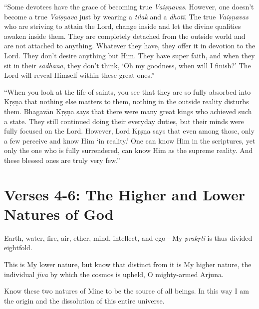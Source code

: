 \enquote{Some devotees have the grace of becoming true \textit{Vaiṣṇavas}. However, one doesn’t become a true \textit{Vaiṣṇava} just by wearing a \textit{tilak} and a \textit{dhotī}. The true \textit{Vaiṣṇavas} who are striving to attain the Lord, change inside and let the divine qualities awaken inside them. They are completely detached from the outside world and are not attached to anything. Whatever they have, they offer it in devotion to the Lord. They don’t desire anything but Him. They have super faith, and when they sit in their \textit{sādhana}, they don’t think, \enquote{Oh my goodness, when will I finish?} The Lord will reveal Himself within these great ones.}

\enquote{When you look at the life of saints, you see that they are so fully absorbed into Kṛṣṇa that nothing else matters to them, nothing in the outside reality disturbs them. Bhagavān Kṛṣṇa says that there were many great kings who achieved such a state. They still continued doing their everyday duties, but their minds were fully focused on the Lord. However, Lord Kṛṣṇa says that even among those, only a few perceive and know Him \enquote{in reality.} One can know Him in the scriptures, yet only the one who is fully surrendered, can know Him as the supreme reality. And these blessed ones are truly very few.}

\section{Verses 4-6: The Higher and Lower Natures of God}\label{sec-verses-4-11-the-higher-and-lower-natures-of-god}
{Earth, water, fire, air, ether, mind, intellect, and ego---My \textit{prakṛti} is thus divided eightfold.}

{This is My lower nature, but know that distinct from it is My higher nature, the individual \textit{jīva} by which the cosmos is upheld, O mighty-armed Arjuna.}

{Know these two natures of Mine to be the source of all beings. In this way I am the origin and the dissolution of this entire universe.}

